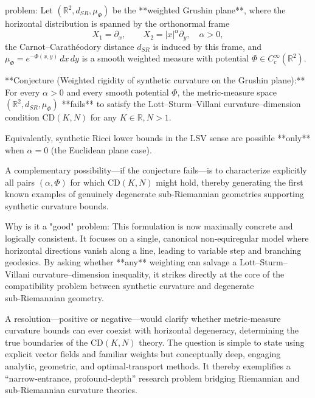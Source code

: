 problem:  
Let \((\mathbb{R}^2,d_{SR},\mu_\Phi)\) be the **weighted Grushin plane**, where the horizontal distribution is spanned by the orthonormal frame
\[
X_1 = \partial_x, \qquad X_2 = |x|^{\alpha}\partial_y, \quad \alpha > 0,
\]
the Carnot–Carathéodory distance \(d_{SR}\) is induced by this frame, and  
\(\mu_\Phi = e^{-\Phi(x,y)}\,dx\,dy\) is a smooth weighted measure with potential \(\Phi \in C^\infty_c(\mathbb{R}^2)\).  

**Conjecture (Weighted rigidity of synthetic curvature on the Grushin plane):**  
For every \(\alpha>0\) and every smooth potential \(\Phi\), the metric‑measure space \((\mathbb{R}^2,d_{SR},\mu_\Phi)\) **fails** to satisfy the Lott–Sturm–Villani curvature–dimension condition \(\mathrm{CD}(K,N)\) for any \(K\in\mathbb{R}, N>1\).

Equivalently, synthetic Ricci lower bounds in the LSV sense are possible **only** when \(\alpha=0\) (the Euclidean plane case).

A complementary possibility—if the conjecture fails—is to characterize explicitly all pairs \((\alpha,\Phi)\) for which \(\mathrm{CD}(K,N)\) might hold, thereby generating the first known examples of genuinely degenerate sub‑Riemannian geometries supporting synthetic curvature bounds.

Why is it a "good" problem:  
This formulation is now maximally concrete and logically consistent. It focuses on a single, canonical non‑equiregular model where horizontal directions vanish along a line, leading to variable step and branching geodesics. By asking whether **any** weighting can salvage a Lott–Sturm–Villani curvature–dimension inequality, it strikes directly at the core of the compatibility problem between synthetic curvature and degenerate sub‑Riemannian geometry.  

A resolution—positive or negative—would clarify whether metric‑measure curvature bounds can ever coexist with horizontal degeneracy, determining the true boundaries of the \(\mathrm{CD}(K,N)\) theory. The question is simple to state using explicit vector fields and familiar weights but conceptually deep, engaging analytic, geometric, and optimal‑transport methods. It thereby exemplifies a “narrow‑entrance, profound‑depth” research problem bridging Riemannian and sub‑Riemannian curvature theories.